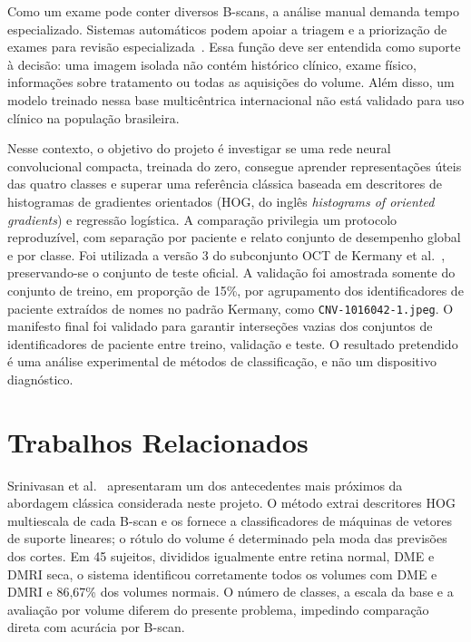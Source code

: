 \documentclass[conference]{IEEEtran}
\begin{document}
Como um exame pode conter diversos B-scans, a análise manual demanda tempo especializado. Sistemas automáticos podem apoiar a triagem e a priorização de exames para revisão especializada~\cite{kermany2018,defauw2018}. Essa função deve ser entendida como suporte à decisão: uma imagem isolada não contém histórico clínico, exame físico, informações sobre tratamento ou todas as aquisições do volume. Além disso, um modelo treinado nessa base multicêntrica internacional não está validado para uso clínico na população brasileira.

Nesse contexto, o objetivo do projeto é investigar se uma rede neural convolucional compacta, treinada do zero, consegue aprender representações úteis das quatro classes e superar uma referência clássica baseada em descritores de histogramas de gradientes orientados (HOG, do inglês \textit{histograms of oriented gradients}) e regressão logística. A comparação privilegia um protocolo reproduzível, com separação por paciente e relato conjunto de desempenho global e por classe. Foi utilizada a versão 3 do subconjunto OCT de Kermany et al.~\cite{kermany_dataset}, preservando-se o conjunto de teste oficial. A validação foi amostrada somente do conjunto de treino, em proporção de 15\%, por agrupamento dos identificadores de paciente extraídos de nomes no padrão Kermany, como \texttt{CNV-1016042-1.jpeg}. O manifesto final foi validado para garantir interseções vazias dos conjuntos de identificadores de paciente entre treino, validação e teste. O resultado pretendido é uma análise experimental de métodos de classificação, e não um dispositivo diagnóstico.

\section{Trabalhos Relacionados}

Srinivasan et al.~\cite{srinivasan2014} apresentaram um dos antecedentes mais próximos da abordagem clássica considerada neste projeto. O método extrai descritores HOG multiescala de cada B-scan e os fornece a classificadores de máquinas de vetores de suporte lineares; o rótulo do volume é determinado pela moda das previsões dos cortes. Em 45 sujeitos, divididos igualmente entre retina normal, DME e DMRI seca, o sistema identificou corretamente todos os volumes com DME e DMRI e 86,67\% dos volumes normais. O número de classes, a escala da base e a avaliação por volume diferem do presente problema, impedindo comparação direta com acurácia por B-scan.
\end{document}
